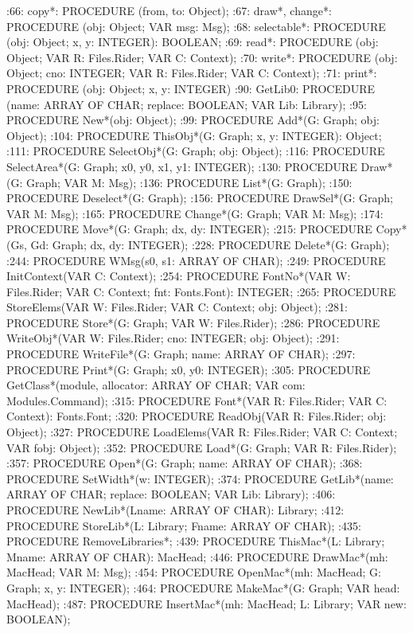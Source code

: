 :66:        copy*: PROCEDURE (from, to: Object);
:67:        draw*, change*: PROCEDURE (obj: Object; VAR msg: Msg);
:68:        selectable*: PROCEDURE (obj: Object; x, y: INTEGER): BOOLEAN;
:69:        read*: PROCEDURE (obj: Object; VAR R: Files.Rider; VAR C: Context);
:70:        write*: PROCEDURE (obj: Object; cno: INTEGER; VAR R: Files.Rider; VAR C: Context);
:71:        print*: PROCEDURE (obj: Object; x, y: INTEGER)
:90:    GetLib0: PROCEDURE (name: ARRAY OF CHAR; replace: BOOLEAN; VAR Lib: Library);
:95:  PROCEDURE New*(obj: Object);
:99:  PROCEDURE Add*(G: Graph; obj: Object);
:104:  PROCEDURE ThisObj*(G: Graph; x, y: INTEGER): Object;
:111:  PROCEDURE SelectObj*(G: Graph; obj: Object);
:116:  PROCEDURE SelectArea*(G: Graph; x0, y0, x1, y1: INTEGER);
:130:  PROCEDURE Draw*(G: Graph; VAR M: Msg);
:136:  PROCEDURE List*(G: Graph);
:150:  PROCEDURE Deselect*(G: Graph);
:156:  PROCEDURE DrawSel*(G: Graph; VAR M: Msg);
:165:  PROCEDURE Change*(G: Graph; VAR M: Msg);
:174:  PROCEDURE Move*(G: Graph; dx, dy: INTEGER);
:215:  PROCEDURE Copy*(Gs, Gd: Graph; dx, dy: INTEGER);
:228:  PROCEDURE Delete*(G: Graph);
:244:  PROCEDURE WMsg(s0, s1: ARRAY OF CHAR);
:249:  PROCEDURE InitContext(VAR C: Context);
:254:  PROCEDURE FontNo*(VAR W: Files.Rider; VAR C: Context; fnt: Fonts.Font): INTEGER;
:265:  PROCEDURE StoreElems(VAR W: Files.Rider; VAR C: Context; obj: Object);
:281:  PROCEDURE Store*(G: Graph; VAR W: Files.Rider);
:286:  PROCEDURE WriteObj*(VAR W: Files.Rider; cno: INTEGER; obj: Object);
:291:  PROCEDURE WriteFile*(G: Graph; name: ARRAY OF CHAR);
:297:  PROCEDURE Print*(G: Graph; x0, y0: INTEGER);
:305:  PROCEDURE GetClass*(module, allocator: ARRAY OF CHAR; VAR com: Modules.Command);
:315:  PROCEDURE Font*(VAR R: Files.Rider; VAR C: Context): Fonts.Font;
:320:  PROCEDURE ReadObj(VAR R: Files.Rider; obj: Object);
:327:  PROCEDURE LoadElems(VAR R: Files.Rider; VAR C: Context; VAR fobj: Object);
:352:  PROCEDURE Load*(G: Graph; VAR R: Files.Rider);
:357:  PROCEDURE Open*(G: Graph; name: ARRAY OF CHAR);
:368:  PROCEDURE SetWidth*(w: INTEGER);
:374:  PROCEDURE GetLib*(name: ARRAY OF CHAR; replace: BOOLEAN; VAR Lib: Library);
:406:  PROCEDURE NewLib*(Lname: ARRAY OF CHAR): Library;
:412:  PROCEDURE StoreLib*(L: Library; Fname: ARRAY OF CHAR);
:435:  PROCEDURE RemoveLibraries*;
:439:  PROCEDURE ThisMac*(L: Library; Mname: ARRAY OF CHAR): MacHead;
:446:  PROCEDURE DrawMac*(mh: MacHead; VAR M: Msg);
:454:  PROCEDURE OpenMac*(mh: MacHead; G: Graph; x, y: INTEGER);
:464:  PROCEDURE MakeMac*(G: Graph; VAR head: MacHead);
:487:  PROCEDURE InsertMac*(mh: MacHead; L: Library; VAR new: BOOLEAN);
